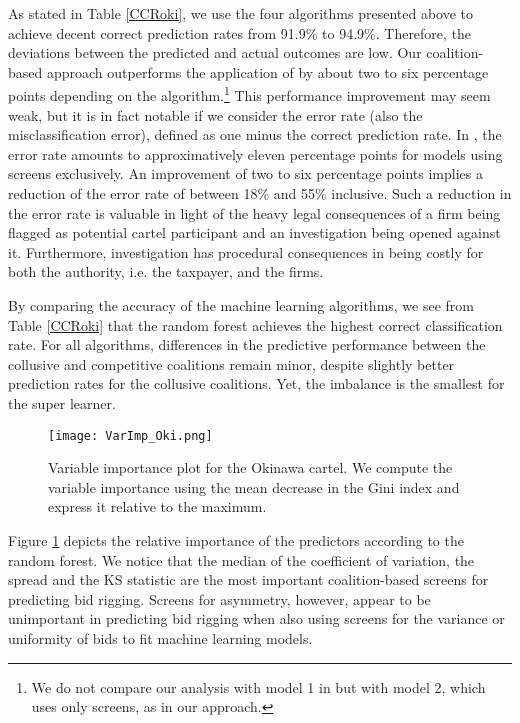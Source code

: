\documentclass[a4paper,11pt]{article}
\begin{document}
	As stated in Table \ref{CCRoki}, we use the four algorithms presented above to achieve decent correct prediction rates from 91.9\% to 94.9\%. Therefore, the deviations between the predicted and actual outcomes are low. Our coalition-based approach outperforms the application of \cite{huber2020transnational} by about two to six percentage points depending on the algorithm.\footnote{We do not compare our analysis with model 1 in \cite{huber2020transnational} but with model 2, which uses only screens, as in our approach.}  This performance improvement may seem weak, but it is in fact notable if we consider the error rate (also the misclassification error), defined as one minus the correct prediction rate. In \cite{huber2020transnational}, the error rate amounts to approximatively eleven percentage points for models using screens exclusively. An improvement of two to six percentage points implies a reduction of the error rate of between 18\% and 55\% inclusive. Such a reduction in the error rate is valuable in light of the heavy legal consequences of a firm being flagged as potential cartel participant and an investigation being opened against it. Furthermore, investigation has procedural consequences in being costly for both the authority, i.e. the taxpayer, and the firms. 
	
	By comparing the accuracy of the machine learning algorithms, we see from Table \ref{CCRoki} that the random forest achieves the highest correct classification rate. For all algorithms, differences in the predictive performance between the collusive and competitive coalitions remain minor, despite slightly better prediction rates for the collusive coalitions. Yet, the imbalance is the smallest for the super learner. 
	
	\begin{figure}[!htp]
		\centering \caption{\label{VarImp_Oki} Variable importance plot for the Okinawa cartel. We compute the variable importance using the mean decrease in the Gini index and express it relative to the maximum.}
		\texttt{[image: VarImp\_Oki.png]}
	\end{figure}
	
	Figure \ref{VarImp_Oki} depicts the relative importance of the predictors according to the random forest. We notice that the median of the coefficient of variation, the spread and the KS statistic are the most important coalition-based screens for predicting bid rigging. Screens for asymmetry, however, appear to be unimportant in predicting bid rigging when also using screens for the variance or uniformity of bids to fit machine learning models. 
	
\end{document}
